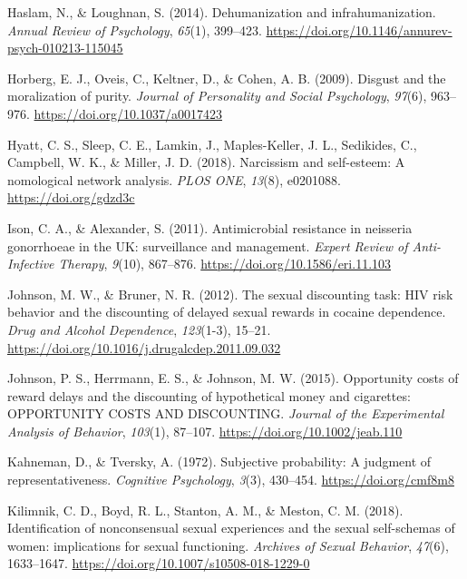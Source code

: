 \documentclass[
  donotrepeattitle,doc, 12pt, a4paper,floatsintext]{apa7}
\newlength{\cslhangindent}
\newlength{\cslentryspacingunit} %
\newenvironment{CSLReferences}[2] %
 {%
  \setlength{\parindent}{0pt}
  \ifodd #1
  \let\oldpar\par
  \def\par{\hangindent=\cslhangindent\oldpar}
  \fi
  \setlength{\parskip}{#2\cslentryspacingunit}
 }%
 {}
\begin{document}
\begin{CSLReferences}{1}{0}
\leavevmode{}%
Haslam, N., \& Loughnan, S. (2014). Dehumanization and infrahumanization. \emph{Annual Review of Psychology}, \emph{65}(1), 399--423. \url{https://doi.org/10.1146/annurev-psych-010213-115045}

\leavevmode{}%
Horberg, E. J., Oveis, C., Keltner, D., \& Cohen, A. B. (2009). Disgust and the moralization of purity. \emph{Journal of Personality and Social Psychology}, \emph{97}(6), 963--976. \url{https://doi.org/10.1037/a0017423}

\leavevmode{}%
Hyatt, C. S., Sleep, C. E., Lamkin, J., Maples-Keller, J. L., Sedikides, C., Campbell, W. K., \& Miller, J. D. (2018). Narcissism and self-esteem: A nomological network analysis. \emph{PLOS ONE}, \emph{13}(8), e0201088. \url{https://doi.org/gdzd3c}

\leavevmode{}%
Ison, C. A., \& Alexander, S. (2011). Antimicrobial resistance in neisseria gonorrhoeae in the UK: surveillance and management. \emph{Expert Review of Anti-Infective Therapy}, \emph{9}(10), 867--876. \url{https://doi.org/10.1586/eri.11.103}

\leavevmode{}%
Johnson, M. W., \& Bruner, N. R. (2012). The sexual discounting task: HIV risk behavior and the discounting of delayed sexual rewards in cocaine dependence. \emph{Drug and Alcohol Dependence}, \emph{123}(1-3), 15--21. \url{https://doi.org/10.1016/j.drugalcdep.2011.09.032}

\leavevmode{}%
Johnson, P. S., Herrmann, E. S., \& Johnson, M. W. (2015). Opportunity costs of reward delays and the discounting of hypothetical money and cigarettes: OPPORTUNITY COSTS AND DISCOUNTING. \emph{Journal of the Experimental Analysis of Behavior}, \emph{103}(1), 87--107. \url{https://doi.org/10.1002/jeab.110}

\leavevmode{}%
Kahneman, D., \& Tversky, A. (1972). Subjective probability: A judgment of representativeness. \emph{Cognitive Psychology}, \emph{3}(3), 430--454. \url{https://doi.org/cmf8m8}

\leavevmode{}%
Kilimnik, C. D., Boyd, R. L., Stanton, A. M., \& Meston, C. M. (2018). Identification of nonconsensual sexual experiences and the sexual self-schemas of women: implications for sexual functioning. \emph{Archives of Sexual Behavior}, \emph{47}(6), 1633--1647. \url{https://doi.org/10.1007/s10508-018-1229-0}


\end{CSLReferences}
\end{document}
